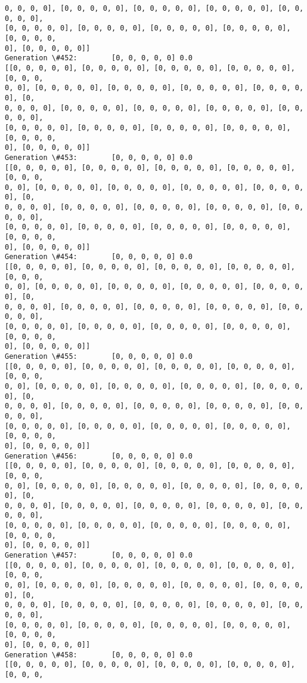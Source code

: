 \documentclass[11pt]{article}
\begin{document}
\begin{Verbatim}[commandchars=\\\{\}]
0, 0, 0, 0], [0, 0, 0, 0, 0], [0, 0, 0, 0, 0], [0, 0, 0, 0, 0], [0, 0, 0, 0, 0],
[0, 0, 0, 0, 0], [0, 0, 0, 0, 0], [0, 0, 0, 0, 0], [0, 0, 0, 0, 0], [0, 0, 0, 0,
0], [0, 0, 0, 0, 0]]
Generation \#452:        [0, 0, 0, 0, 0] 0.0
[[0, 0, 0, 0, 0], [0, 0, 0, 0, 0], [0, 0, 0, 0, 0], [0, 0, 0, 0, 0], [0, 0, 0,
0, 0], [0, 0, 0, 0, 0], [0, 0, 0, 0, 0], [0, 0, 0, 0, 0], [0, 0, 0, 0, 0], [0,
0, 0, 0, 0], [0, 0, 0, 0, 0], [0, 0, 0, 0, 0], [0, 0, 0, 0, 0], [0, 0, 0, 0, 0],
[0, 0, 0, 0, 0], [0, 0, 0, 0, 0], [0, 0, 0, 0, 0], [0, 0, 0, 0, 0], [0, 0, 0, 0,
0], [0, 0, 0, 0, 0]]
Generation \#453:        [0, 0, 0, 0, 0] 0.0
[[0, 0, 0, 0, 0], [0, 0, 0, 0, 0], [0, 0, 0, 0, 0], [0, 0, 0, 0, 0], [0, 0, 0,
0, 0], [0, 0, 0, 0, 0], [0, 0, 0, 0, 0], [0, 0, 0, 0, 0], [0, 0, 0, 0, 0], [0,
0, 0, 0, 0], [0, 0, 0, 0, 0], [0, 0, 0, 0, 0], [0, 0, 0, 0, 0], [0, 0, 0, 0, 0],
[0, 0, 0, 0, 0], [0, 0, 0, 0, 0], [0, 0, 0, 0, 0], [0, 0, 0, 0, 0], [0, 0, 0, 0,
0], [0, 0, 0, 0, 0]]
Generation \#454:        [0, 0, 0, 0, 0] 0.0
[[0, 0, 0, 0, 0], [0, 0, 0, 0, 0], [0, 0, 0, 0, 0], [0, 0, 0, 0, 0], [0, 0, 0,
0, 0], [0, 0, 0, 0, 0], [0, 0, 0, 0, 0], [0, 0, 0, 0, 0], [0, 0, 0, 0, 0], [0,
0, 0, 0, 0], [0, 0, 0, 0, 0], [0, 0, 0, 0, 0], [0, 0, 0, 0, 0], [0, 0, 0, 0, 0],
[0, 0, 0, 0, 0], [0, 0, 0, 0, 0], [0, 0, 0, 0, 0], [0, 0, 0, 0, 0], [0, 0, 0, 0,
0], [0, 0, 0, 0, 0]]
Generation \#455:        [0, 0, 0, 0, 0] 0.0
[[0, 0, 0, 0, 0], [0, 0, 0, 0, 0], [0, 0, 0, 0, 0], [0, 0, 0, 0, 0], [0, 0, 0,
0, 0], [0, 0, 0, 0, 0], [0, 0, 0, 0, 0], [0, 0, 0, 0, 0], [0, 0, 0, 0, 0], [0,
0, 0, 0, 0], [0, 0, 0, 0, 0], [0, 0, 0, 0, 0], [0, 0, 0, 0, 0], [0, 0, 0, 0, 0],
[0, 0, 0, 0, 0], [0, 0, 0, 0, 0], [0, 0, 0, 0, 0], [0, 0, 0, 0, 0], [0, 0, 0, 0,
0], [0, 0, 0, 0, 0]]
Generation \#456:        [0, 0, 0, 0, 0] 0.0
[[0, 0, 0, 0, 0], [0, 0, 0, 0, 0], [0, 0, 0, 0, 0], [0, 0, 0, 0, 0], [0, 0, 0,
0, 0], [0, 0, 0, 0, 0], [0, 0, 0, 0, 0], [0, 0, 0, 0, 0], [0, 0, 0, 0, 0], [0,
0, 0, 0, 0], [0, 0, 0, 0, 0], [0, 0, 0, 0, 0], [0, 0, 0, 0, 0], [0, 0, 0, 0, 0],
[0, 0, 0, 0, 0], [0, 0, 0, 0, 0], [0, 0, 0, 0, 0], [0, 0, 0, 0, 0], [0, 0, 0, 0,
0], [0, 0, 0, 0, 0]]
Generation \#457:        [0, 0, 0, 0, 0] 0.0
[[0, 0, 0, 0, 0], [0, 0, 0, 0, 0], [0, 0, 0, 0, 0], [0, 0, 0, 0, 0], [0, 0, 0,
0, 0], [0, 0, 0, 0, 0], [0, 0, 0, 0, 0], [0, 0, 0, 0, 0], [0, 0, 0, 0, 0], [0,
0, 0, 0, 0], [0, 0, 0, 0, 0], [0, 0, 0, 0, 0], [0, 0, 0, 0, 0], [0, 0, 0, 0, 0],
[0, 0, 0, 0, 0], [0, 0, 0, 0, 0], [0, 0, 0, 0, 0], [0, 0, 0, 0, 0], [0, 0, 0, 0,
0], [0, 0, 0, 0, 0]]
Generation \#458:        [0, 0, 0, 0, 0] 0.0
[[0, 0, 0, 0, 0], [0, 0, 0, 0, 0], [0, 0, 0, 0, 0], [0, 0, 0, 0, 0], [0, 0, 0,

\end{Verbatim}
\end{document}
